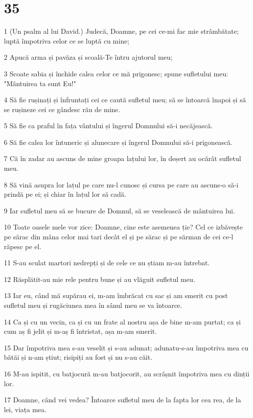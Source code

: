 \chapter{35}

\par 1 (Un psalm al lui David.) Judecă, Doamne, pe cei ce-mi fac mie strâmbătate; luptă împotriva celor ce se luptă cu mine;
\par 2 Apucă arma și pavăza și scoală-Te întru ajutorul meu;
\par 3 Scoate sabia și închide calea celor ce mă prigonesc; spune sufletului meu: "Mântuirea ta sunt Eu!"
\par 4 Să fie rușinați și înfruntați cei ce caută sufletul meu; să se întoarcă înapoi și să se rușineze cei ce gândesc rău de mine.
\par 5 Să fie ca praful în fața vântului și îngerul Domnului să-i necăjească.
\par 6 Să fie calea lor întuneric și alunecare și îngerul Domnului să-i prigonească.
\par 7 Că în zadar au ascuns de mine groapa lațului lor, în deșert au ocărât sufletul meu.
\par 8 Să vină asupra lor lațul pe care nu-l cunosc și cursa pe care au ascuns-o să-i prindă pe ei; și chiar în lațul lor să cadă.
\par 9 Iar sufletul meu să se bucure de Domnul, să se veselească de mântuirea lui.
\par 10 Toate oasele mele vor zice: Doamne, cine este asemenea ție? Cel ce izbăvește pe sărac din mâna celor mai tari decât el și pe sărac și pe sărman de cei ce-l răpesc pe el.
\par 11 S-au sculat martori nedrepți și de cele ce nu știam m-au întrebat.
\par 12 Răsplătit-au mie rele pentru bune și au vlăguit sufletul meu.
\par 13 Iar eu, când mă supărau ei, m-am îmbrăcat cu sac și am smerit cu post sufletul meu și rugăciunea mea în sânul meu se va întoarce.
\par 14 Ca și cu un vecin, ca și cu un frate al nostru așa de bine m-am purtat; ca și cum aș fi jelit și m-aș fi întristat, așa m-am smerit.
\par 15 Dar împotriva mea s-au veselit și s-au adunat; adunatu-s-au împotriva mea cu bătăi și n-am știut; risipiți au fost și nu s-au căit.
\par 16 M-au ispitit, cu batjocură m-au batjocorit, au scrâșnit împotriva mea cu dinții lor.
\par 17 Doamne, când vei vedea? Întoarce sufletul meu de la fapta lor cea rea, de la lei, viața mea.
